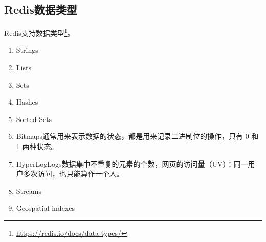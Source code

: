 \documentclass[../../../interview-questions.tex]{subfiles}
\begin{document}
\subsection{Redis数据类型}

Redis支持数据类型\footnote{\url{https://redis.io/docs/data-types/}}。

\begin{enumerate}
    \item {Strings}
    \item {Lists}
    \item {Sets}
    \item {Hashes}
    \item {Sorted Sets}
    \item {Bitmaps}通常用来表示数据的状态，都是用来记录二进制位的操作，只有 0 和 1 两种状态。
    \item {HyperLogLogs}数据集中不重复的元素的个数，网页的访问量（UV）：同一用户多次访问，也只能算作一个人。
    \item {Streams}
    \item {Geospatial indexes}
\end{enumerate}
\end{document}
